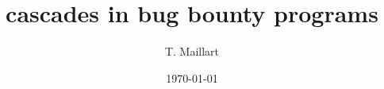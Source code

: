 \documentclass[12pt]{revtex4}
\begin{document}
\title{cascades in bug bounty programs}

\author{T. Maillart}





\date{\today}


\begin{abstract}
\vspace{1cm}

\end{abstract}

\maketitle

%
%
%





\end{document}
